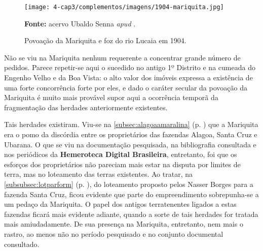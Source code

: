 
\begin{figure}[!htp]
\centering
\caption{Povoação da Mariquita e foz do rio Lucaia em 1904.}\texttt{[image: 4-cap3/complementos/imagens/1904-mariquita.jpg]}{\par \footnotesize \textbf{Fonte:} acervo Ubaldo Senna \textit{apud} . }
\label{fig:mariquita01}
\end{figure}


Não se viu na Mariquita nenhum requerente a concentrar grande número de pedidos. Parece repetir-se aqui o sucedido no antigo 1º Distrito e na cumeada do Engenho Velho e da Boa Vista: o alto valor dos imóveis expressa a existência de uma forte concorrência forte por eles, e dado o caráter secular da povoação da Mariquita é muito mais provável supor aqui a ocorrência temporã da fragmentação das herdades anteriormente existentes.

Tais herdades existiram. Viu-se na \autoref{subsec:alagoaamaralina} (p. \pageref{subsec:alagoaamaralina}) que a Mariquita era o pomo da discórdia entre os proprietários das fazendas Alagoa, Santa Cruz e Ubarana. O que se viu na documentação pesquisada, na bibliografia consultada e nos periódicos da \textbf{Hemeroteca Digital Brasileira}, entretanto, foi que os esforços dos proprietários não pareciam mais estar na disputa por limites de terra, mas no loteamento das terras existentes. Ao tratar, na \autoref{subsubsec:lotparform} (p. \pageref{subsubsec:lotparform}), do loteamento proposto pelos Nasser Borges para a fazenda Santa Cruz, ficou evidente que parte do empreendimento sobrepunha-se a um pedaço da Mariquita. O papel dos antigos terratenentes ligados a estas fazendas ficará mais evidente adiante, quando a sorte de tais herdades for tratada mais amiudadamente. De sua presença na Mariquita, entretanto, nem mais o rastro, ao menos não no período pesquisado e no conjunto documental consultado.

